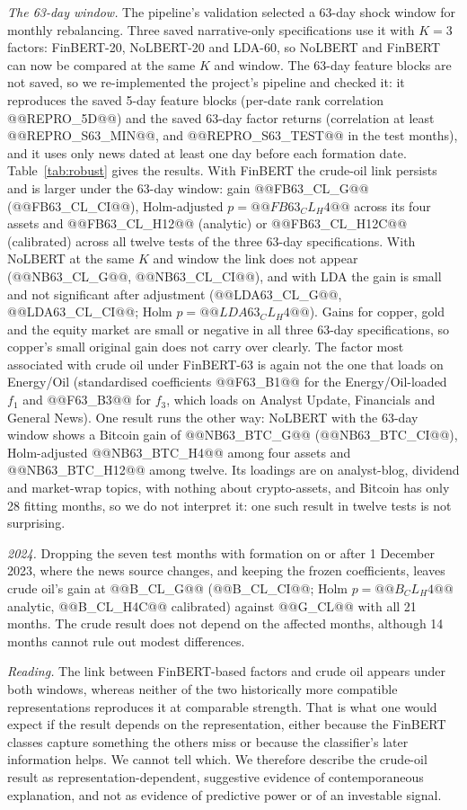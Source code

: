\documentclass[11pt]{article}
\begin{document}
\emph{The 63-day window.} The pipeline's validation selected a 63-day shock window for monthly rebalancing. Three saved narrative-only specifications use it with $K=3$ factors: FinBERT-20, NoLBERT-20 and LDA-60, so NoLBERT and FinBERT can now be compared at the same $K$ and window. The 63-day feature blocks are not saved, so we re-implemented the project's pipeline and checked it: it reproduces the saved 5-day feature blocks (per-date rank correlation @@REPRO_5D@@) and the saved 63-day factor returns (correlation at least @@REPRO_S63_MIN@@, and @@REPRO_S63_TEST@@ in the test months), and it uses only news dated at least one day before each formation date. Table~\ref{tab:robust} gives the results. With FinBERT the crude-oil link persists and is larger under the 63-day window: gain @@FB63_CL_G@@ (@@FB63_CL_CI@@), Holm-adjusted $p=@@FB63_CL_H4@@$ across its four assets and @@FB63_CL_H12@@ (analytic) or @@FB63_CL_H12C@@ (calibrated) across all twelve tests of the three 63-day specifications. With NoLBERT at the same $K$ and window the link does not appear (@@NB63_CL_G@@, @@NB63_CL_CI@@), and with LDA the gain is small and not significant after adjustment (@@LDA63_CL_G@@, @@LDA63_CL_CI@@; Holm $p=@@LDA63_CL_H4@@$). Gains for copper, gold and the equity market are small or negative in all three 63-day specifications, so copper's small original gain does not carry over clearly. The factor most associated with crude oil under FinBERT-63 is again not the one that loads on Energy/Oil (standardised coefficients @@F63_B1@@ for the Energy/Oil-loaded $f_1$ and @@F63_B3@@ for $f_3$, which loads on Analyst Update, Financials and General News). One result runs the other way: NoLBERT with the 63-day window shows a Bitcoin gain of @@NB63_BTC_G@@ (@@NB63_BTC_CI@@), Holm-adjusted @@NB63_BTC_H4@@ among four assets and @@NB63_BTC_H12@@ among twelve. Its loadings are on analyst-blog, dividend and market-wrap topics, with nothing about crypto-assets, and Bitcoin has only 28 fitting months, so we do not interpret it: one such result in twelve tests is not surprising.

\emph{2024.} Dropping the seven test months with formation on or after 1 December 2023, where the news source changes, and keeping the frozen coefficients, leaves crude oil's gain at @@B_CL_G@@ (@@B_CL_CI@@; Holm $p=@@B_CL_H4@@$ analytic, @@B_CL_H4C@@ calibrated) against @@G_CL@@ with all 21 months. The crude result does not depend on the affected months, although 14 months cannot rule out modest differences.

\emph{Reading.} The link between FinBERT-based factors and crude oil appears under both windows, whereas neither of the two historically more compatible representations reproduces it at comparable strength. That is what one would expect if the result depends on the representation, either because the FinBERT classes capture something the others miss or because the classifier's later information helps. We cannot tell which. We therefore describe the crude-oil result as representation-dependent, suggestive evidence of contemporaneous explanation, and not as evidence of predictive power or of an investable signal.
\end{document}
